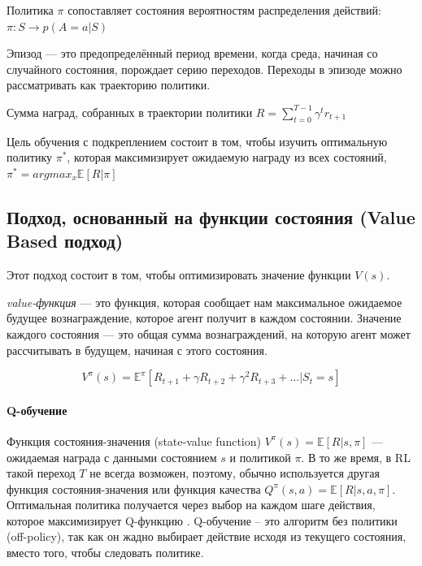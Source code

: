 Политика $\pi$ сопоставляет состояния вероятностям распределения действий: $\pi : S \to p(A = a|S)$

Эпизод --- это предопределённый период времени, когда среда, начиная со случайного состояния, порождает серию переходов. Переходы в эпизоде можно рассматривать как траекторию политики.

Сумма наград, собранных в траектории политики $R = \sum_{t=0}^{T-1} \gamma^t r_{t+1}$

Цель обучения с подкреплением состоит в том, чтобы изучить оптимальную политику ${\pi^*}$, которая максимизирует ожидаемую награду из всех состояний, $\pi^* = argmax_x \mathbb{E} [R|\pi]$ \cite{Otterlo2012ReinforcementLA}

\subsection{Подход, основанный на функции состояния (Value Based подход)}

Этот подход состоит в том, чтобы оптимизировать значение функции $V(s)$.

\textit{value-функция} — это функция, которая сообщает нам максимальное ожидаемое будущее вознаграждение, которое агент получит в каждом состоянии. Значение каждого состояния — это общая сумма вознаграждений, на которую агент может рассчитывать в будущем, начиная с этого состояния.

\begin{equation} \label{eq:someEq}
V^\pi (s) = \mathbb{E}^\pi [R_{t+1} + \gamma R_{t+2} + \gamma^2 R_{t+3} + ... |S_t = s]
\end{equation}

\paragraph{Q-обучение}

Функция состояния-значения (state-value function) $V^\pi (s) = \mathbb{E}[R|s, \pi]$ --- ожидаемая награда с данными состоянием $s$ и политикой $\pi$. В то же время, в RL такой переход $T$ не всегда возможен, поэтому, обычно используется другая функция состояния-значения или функция качества $Q^\pi(s,a) = \mathbb{E}[R|s, a, \pi]$. Оптимальная политика получается через выбор на каждом шаге действия, которое максимизирует Q-функцию \cite{SuttonAndBarto-RL-Introduction-p107}. Q-обучение -- это алгоритм без политики (off-policy), так как он жадно выбирает действие исходя из текущего состояния, вместо того, чтобы следовать политике.

